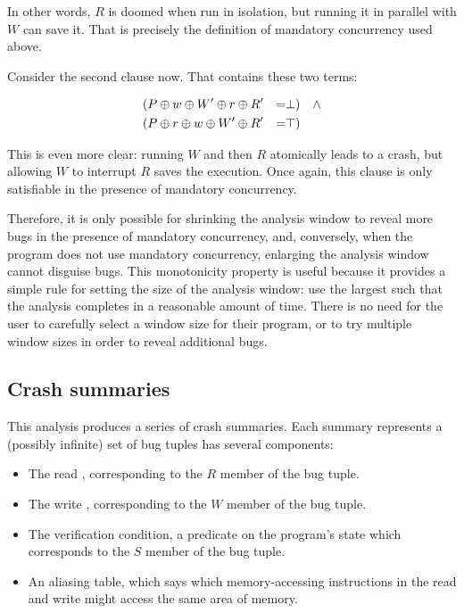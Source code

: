 In other words, $R$ is doomed when run in isolation, but running it in parallel with $W$ can save it.
That is precisely the definition of mandatory concurrency used above.

Consider the second clause now.
That contains these two terms:

\begin{align*}
  & (P \oplus w \oplus W' \oplus r \oplus R' & = & \bot) & \wedge \\
  & (P \oplus r \oplus w \oplus W' \oplus R' & = & \top)
\end{align*}

This is even more clear: running $W$ and then $R$ atomically leads to a crash, but allowing $W$ to interrupt $R$ saves the execution.
Once again, this clause is only satisfiable in the presence of mandatory concurrency.

Therefore, it is only possible for shrinking the analysis window to reveal more bugs in the presence of mandatory concurrency, and, conversely, when the program does not use mandatory concurrency, enlarging the analysis window cannot disguise bugs.
This monotonicity property is useful because it provides a simple rule for setting the size of the analysis window: use the largest such that the analysis completes in a reasonable amount of time.
There is no need for the user to carefully select a window size for their program, or to try multiple window sizes in order to reveal additional bugs.

\label{sect:monotonicity}


\subsection{Crash summaries}

This analysis produces a series of crash summaries.
Each summary represents a (possibly infinite) set of bug tuples has several components:

\begin{itemize}
\item The read \StateMachine, corresponding to the $R$ member of the bug tuple.
\item The write \StateMachine, corresponding to the $W$ member of the bug tuple.
\item The verification condition, a predicate on the program's state which corresponds to the $S$ member of the bug tuple.
\item An aliasing table, which says which memory-accessing instructions in the read and write \StateMachines might access the same area of memory.
\end{itemize}

